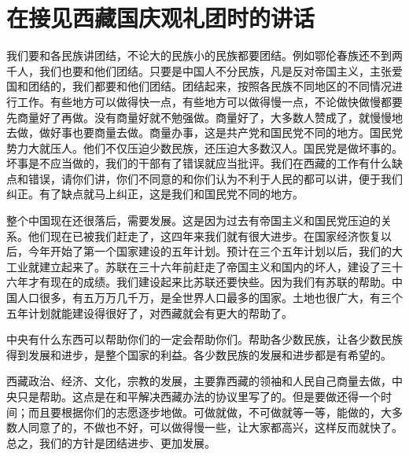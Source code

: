 \section[在接见西藏国庆观礼团时的讲话（一九五三年十月十八日）]{在接见西藏国庆观礼团时的讲话}


我们要和各民族讲团结，不论大的民族小的民族都要团结。例如鄂伦春族还不到两千人，我们也要和他们团结。只要是中国人不分民族，凡是反对帝国主义，主张爱国和团结的，我们都要和他们团结。团结起来，按照各民族不同地区的不同情况进行工作。有些地方可以做得快一点，有些地方可以做得慢一点，不论做快做慢都要先商量好了再做。没有商量好就不勉强做。商量好了，大多数人赞成了，就慢慢地去做，做好事也要商量去做。商量办事，这是共产党和国民党不同的地方。国民党势力大就压人。他们不仅压迫少数民族，还压迫大多数汉人。国民党是做坏事的。坏事是不应当做的，我们的干部有了错误就应当批评。我们在西藏的工作有什么缺点和错误，请你们讲，你们不同意的和你们认为不利于人民的都可以讲，便于我们纠正。有了缺点就马上纠正，这是我们和国民党不同的地方。

整个中国现在还很落后，需要发展。这是因为过去有帝国主义和国民党压迫的关系。他们现在已被我们赶走了，这四年来我们就有很大进步。在国家经济恢复以后，今年开始了第一个国家建设的五年计划。预计在三个五年计划以后，我们的大工业就建立起来了。苏联在三十六年前赶走了帝国主义和国内的坏人，建设了三十六年才有现在的成绩。我们建设起来比苏联还要快些。因为我们有苏联的帮助。中国人口很多，有五万万几千万，是全世界人口最多的国家。土地也很广大，有三个五年计划就能建设得很好了，对西藏就会有更大的帮助了。

中央有什么东西可以帮助你们的一定会帮助你们。帮助各少数民族，让各少数民族得到发展和进步，是整个国家的利益。各少数民族的发展和进步都是有希望的。

西藏政治、经济、文化，宗教的发展，主要靠西藏的领袖和人民自己商量去做，中央只是帮助。这点是在和平解决西藏办法的协议里写了的。但是要做还得一个时间；而且要根据你们的志愿逐步地做。可做就做，不可做就等一等，能做的，大多数人同意了的，不做也不好，可以做得慢一些，让大家都高兴，这样反而就快了。总之，我们的方针是团结进步、更加发展。



